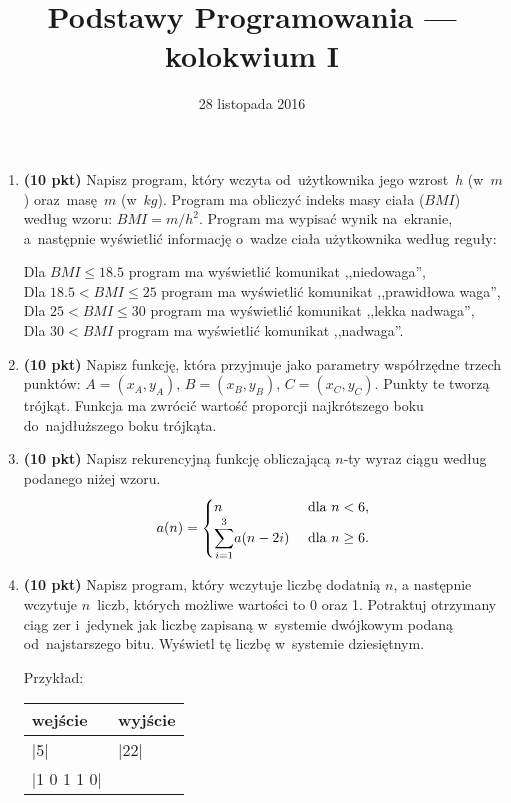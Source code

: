\documentclass[extrafontsizes,12pt]{article}
\title{Podstawy Programowania --- kolokwium I}
\date{28 listopada 2016}
\begin{document}
\maketitle
\DefineShortVerb{\|}
\thispagestyle{empty}

\begin{enumerate}
\itemsep1em


\item \textbf{(10 pkt)}
Napisz program, który wczyta od~użytkownika jego wzrost~$h$ (w~$m$) oraz~masę~$m$ (w~$kg$).
Program ma obliczyć indeks masy ciała ($BMI$) według wzoru: $BMI = m / h ^ 2$.
Program ma wypisać wynik na~ekranie,
a~następnie wyświetlić informację o~wadze ciała użytkownika według reguły:

Dla $BMI \le 18.5$ program ma wyświetlić komunikat ,,niedowaga'',\\
Dla $18.5 < BMI \le 25$ program ma wyświetlić komunikat ,,prawidłowa waga'',\\
Dla $25 < BMI \le 30$ program ma wyświetlić komunikat ,,lekka nadwaga'',\\
Dla $30 < BMI$ program ma wyświetlić komunikat ,,nadwaga''.


\item \textbf{(10 pkt)}
Napisz funkcję, która przyjmuje jako parametry współrzędne trzech punktów:
$A = (x_A, y_A)$, $B = (x_B, y_B)$, $C = (x_C, y_C)$.
Punkty te tworzą trójkąt.
Funkcja ma zwrócić wartość proporcji najkrótszego boku do~najdłuższego boku trójkąta.


\item \textbf{(10 pkt)}
Napisz rekurencyjną funkcję obliczającą $n$-ty wyraz ciągu według podanego niżej wzoru.
\begin{equation*}
a(n) =
	\begin{cases}
		n  & \mbox{ dla } n < 6,\\
		\mathlarger{\sum_{i=1}^{3}} a(n-2i) & \mbox{ dla } n \ge{} 6.
	\end{cases}
\end{equation*}


\item \textbf{(10 pkt)}
Napisz program, który wczytuje liczbę dodatnią $n$,
a następnie wczytuje $n$~liczb,
których możliwe wartości to 0 oraz 1.
Potraktuj otrzymany ciąg zer i~jedynek jak liczbę zapisaną
w~systemie dwójkowym podaną od~najstarszego bitu.
Wyświetl tę liczbę w~systemie dziesiętnym.

Przykład:
\begin{center}
  \begin{tabular}{ l l }
  wejście & wyjście \\
  \hline
  |5| & |22| \\
  |1 0 1 1 0|
  \end{tabular}
\end{center}

\end{enumerate}
\end{document}
